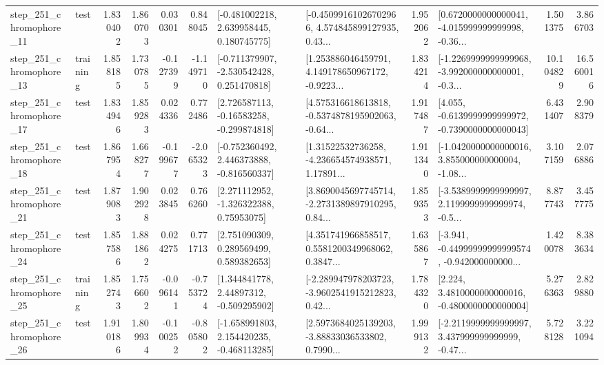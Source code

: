 \begin{tabular}{llrrrrllrlrr}
  step\_251\_chromophore\_11 &      test &      1.830402 &    1.860703 &      0.030301 &  0.848045 &    [-0.481002218, 2.639958445, 0.180745775] &  [-0.45099161026702966, 4.574845899127935, 0.43... &       1.952062 &  [0.6720000000000041, -4.015999999999998, -0.36... &            1.501375 &          3.866703 \\
  step\_251\_chromophore\_13 &  training &      1.858185 &    1.730785 &     -0.127399 & -1.149710 &   [-0.711379907, -2.530542428, 0.251470818] &  [1.253886046459791, 4.149178650967172, -0.9223... &       1.834214 &  [-1.2269999999999968, -3.992000000000001, -0.3... &           10.104829 &         16.560016 \\
  step\_251\_chromophore\_17 &      test &      1.834946 &    1.859283 &      0.024336 &  0.772486 &    [2.726587113, -0.16583258, -0.299874818] &  [4.575316618613818, -0.5374878195902063, -0.64... &       1.917487 &  [4.055, -0.6139999999999972, -0.7390000000000043] &            6.431407 &          2.908379 \\
  step\_251\_chromophore\_18 &      test &      1.867954 &    1.668277 &     -0.199677 & -2.065323 &   [-0.752360492, 2.446373888, -0.816560337] &  [1.31522532736258, -4.236654574938571, 1.17891... &       1.911340 &  [-1.0420000000000016, 3.855000000000004, -1.08... &            3.107159 &          2.076886 \\
  step\_251\_chromophore\_21 &      test &      1.879083 &    1.902928 &      0.023845 &  0.766260 &     [2.271112952, -1.326322388, 0.75953075] &  [3.8690045697745714, -2.2731389897910295, 0.84... &       1.859353 &  [-3.5389999999999997, 2.1199999999999974, -0.5... &            8.877743 &          3.457775 \\
  step\_251\_chromophore\_24 &      test &      1.857586 &    1.881862 &      0.024275 &  0.771713 &     [2.751090309, 0.289569499, 0.589382653] &  [4.351741966858517, 0.5581200349968062, 0.3847... &       1.635867 &  [-3.941, -0.44999999999999574, -0.942000000000... &            1.420078 &          8.383634 \\
  step\_251\_chromophore\_25 &  training &      1.852743 &    1.756602 &     -0.096141 & -0.753724 &     [1.344841778, 2.44897312, -0.509295902] &  [-2.289947978203723, -3.9602541915212823, 0.42... &       1.784320 &   [2.224, 3.4810000000000016, -0.4800000000000004] &            5.276363 &          2.829880 \\
  step\_251\_chromophore\_26 &      test &      1.910186 &    1.809934 &     -0.100252 & -0.805802 &   [-1.658991803, 2.154420235, -0.468113285] &  [2.5973684025139203, -3.88833036533802, 0.7990... &       1.999132 &  [-2.2119999999999997, 3.437999999999999, -0.47... &            5.728128 &          3.221094 \\

\end{tabular}

